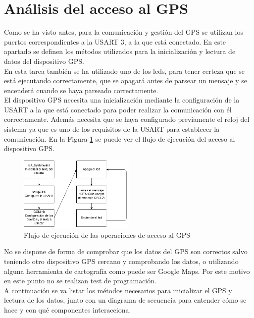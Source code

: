 \section{Análisis del acceso al GPS}
\label{obj4}
Como se ha visto antes, para la comunicación y gestión del GPS se utilizan los puertos correspondientes a la USART 3, a la que está conectado. En este apartado se definen los métodos utilizados para la inicialización y lectura de datos del dispositivo GPS.\\

En esta tarea también se ha utilizado uno de los leds, para tener certeza que se está ejecutando correctamente, que se apagará antes de parsear un mensaje y se encenderá cuando se haya parseado correctamente.\\

El dispositivo GPS necesita una inicialización mediante la configuración de la USART a la que está conectado para poder realizar la comunicación con él correctamente. Además necesita que se haya configurado previamente el reloj del sistema ya que es uno de los requisitos de la USART para establecer la comunicación. En la Figura \ref{fig:GPSDiagram} se puede ver el flujo de ejecución del acceso al dispositivo GPS.\\

\begin{figure}[!h]
\begin{center}
\includegraphics[width=0.5\textwidth]{figs/GPSDiagram.png}
\caption{Flujo de ejecución de las operaciones de acceso al GPS}
\label{fig:GPSDiagram}
\end{center}
\end{figure}

No se dispone de forma de comprobar que los datos del GPS son correctos salvo teniendo otro dispositivo GPS cercano y comprobando los datos, o utilizando alguna herramienta de cartografía como puede ser Google Maps. Por este motivo en este punto no se realizan test de programación.\\

A continuación se va listar los métodos necesarios para inicializar el GPS y lectura de los datos, junto con un diagrama de secuencia para entender cómo se hace y con qué componentes interacciona. \\


